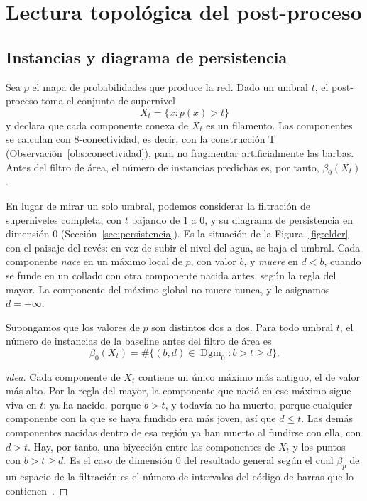 \section{Lectura topológica del post-proceso}
\label{sec:lectura-topologica}

\subsection{Instancias y diagrama de persistencia}

Sea $p$ el mapa de probabilidades que produce la red. Dado un umbral
$t$, el post-proceso toma el conjunto de supernivel
\[
  X_t=\{x : p(x)>t\}
\]
y declara que cada componente conexa de $X_t$ es un filamento. Las
componentes se calculan con 8-conectividad, es decir, con la
construcción T (Observación~\ref{obs:conectividad}), para no fragmentar
artificialmente las barbas. Antes del filtro de área, el número de
instancias predichas es, por tanto, $\beta_0(X_t)$.

En lugar de mirar un solo umbral, podemos considerar la filtración de
superniveles completa, con $t$ bajando de $1$ a $0$, y su diagrama de
persistencia en dimensión $0$ (Sección~\ref{sec:persistencia}). Es la
situación de la Figura~\ref{fig:elder} con el paisaje del revés: en vez
de subir el nivel del agua, se baja el umbral. Cada componente
\emph{nace} en un máximo local de $p$, con valor $b$, y \emph{muere} en
$d<b$, cuando se funde en un collado con otra componente nacida antes,
según la regla del mayor. La componente del máximo global no muere
nunca, y le asignamos $d=-\infty$.

\begin{proposicion}
\label{prop:instancias}
Supongamos que los valores de $p$ son distintos dos a dos. Para todo
umbral $t$, el número de instancias de la baseline antes del
filtro de área es
\[
  \beta_0(X_t)=\#\{(b,d)\in\operatorname{Dgm}_0 : b>t\ge d\}.
\]
\end{proposicion}

\begin{proof}[idea]
Cada componente de $X_t$ contiene un único máximo más antiguo, el de
valor más alto. Por la regla del mayor, la componente que nació en ese
máximo sigue viva en $t$: ya ha nacido, porque $b>t$, y todavía no ha
muerto, porque cualquier componente con la que se haya fundido era más
joven, así que $d\le t$. Las demás componentes nacidas dentro de esa
región ya han muerto al fundirse con ella, con $d>t$. Hay, por tanto, una
biyección entre las componentes de $X_t$ y los puntos con $b>t\ge d$.
Es el caso de dimensión $0$ del resultado general según el cual
$\beta_p$ de un espacio de la filtración es el número de intervalos del
código de barras que lo contienen~\cite[§VII.1]{edelsbrunner2010}.
\end{proof}

